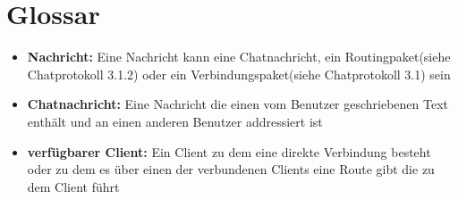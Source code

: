 \section{Glossar}

\begin{itemize}
    \item \textbf{Nachricht: } Eine Nachricht kann eine Chatnachricht, ein Routingpaket(siehe Chatprotokoll 3.1.2) oder ein Verbindungspaket(siehe Chatprotokoll 3.1) sein
    \item \textbf{Chatnachricht: } Eine Nachricht die einen vom Benutzer geschriebenen Text enthält und an einen anderen Benutzer addressiert ist
    \item \textbf{verfügbarer Client: } Ein Client zu dem eine direkte Verbindung besteht oder zu dem es über einen der verbundenen Clients eine Route gibt die zu dem Client führt
\end{itemize}